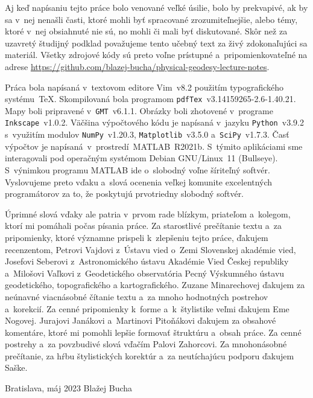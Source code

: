 \documentclass[a4paper, 12pt]{book}
\begin{document}
Aj keď napísaniu tejto práce bolo venované veľké úsilie, bolo by prekvapivé, ak 
by sa v~nej nenašli časti, ktoré mohli byť spracované zrozumiteľnejšie, alebo 
témy, ktoré v~nej obsiahnuté nie sú, no mohli či mali byť diskutované.  Skôr 
než za uzavretý študijný podklad považujeme tento učebný text za živý 
zdokonaľujúci sa materiál.  Všetky zdrojové kódy sú preto voľne prístupné 
a~pripomienkovateľné na adrese 
\url{https://github.com/blazej-bucha/physical-geodesy-lecture-notes}.

Práca bola napísaná v~textovom editore Vim~v8.2 použitím typografického 
systému~\TeX.  Skompilovaná bola programom 
\texttt{pdfTex}~v3.14159265-2.6-1.40.21.  Mapy boli pripravené 
v~\texttt{GMT}~v6.1.1.  Obrázky boli zhotovené v~programe 
\texttt{Inkscape}~v1.0.2.  Väčšina výpočtového kódu je napísaná v~jazyku 
\texttt{Python}~v3.9.2 s~využitím modulov \texttt{NumPy}~v1.20.3, 
\texttt{Matplotlib}~v3.5.0 a~\texttt{SciPy}~v1.7.3.  Časť výpočtov je 
napísaná~v~prostredí~MATLAB~R2021b.  S~týmito aplikáciami sme interagovali pod 
operačným systémom Debian GNU/Linux~11 (Bullseye).  S~výnimkou programu MATLAB 
ide o~slobodný voľne šíriteľný softvér.  Vyslovujeme preto vďaku a~slová 
ocenenia veľkej komunite excelentných programátorov za to, že poskytujú 
prvotriedny slobodný softvér.

Úprimné slová vďaky ale patria v~prvom rade blízkym, priateľom a~kolegom, ktorí 
mi pomáhali počas písania práce.  Za starostlivé prečítanie textu a~za 
pripomienky, ktoré významne prispeli k~zlepšeniu tejto práce, ďakujem 
recenzentom, Petrovi Vajdovi z~Ústavu vied o~Zemi Slovenskej akadémie vied, 
Josefovi Seberovi z~Astronomického ústavu Akadémie Vied Českej republiky 
a~Milošovi Vaľkovi z~Geodetického observatória Pecný Výskumného ústavu 
geodetického, topografického a kartografického.  Zuzane Minarechovej ďakujem za 
neúnavné viacnásobné čítanie textu a~za mnoho hodnotných postrehov a~korekcií.  
Za cenné pripomienky k~forme a~k~štylistike veľmi ďakujem Eme Nogovej.  
Jurajovi Janákovi a~Martinovi Pitoňákovi ďakujem za obsahové komentáre, ktoré 
mi pomohli lepšie formovať štruktúru a~obsah práce.  Za cenné postrehy a~za 
povzbudivé slová vďačím Palovi Zahorcovi.  Za mnohonásobné prečítanie, za hŕbu 
štylistických korektúr a~za neutíchajúcu podporu ďakujem Saške.


\vspace{4ex}

\noindent Bratislava, máj 2023 \hfill Blažej Bucha
\end{document}
